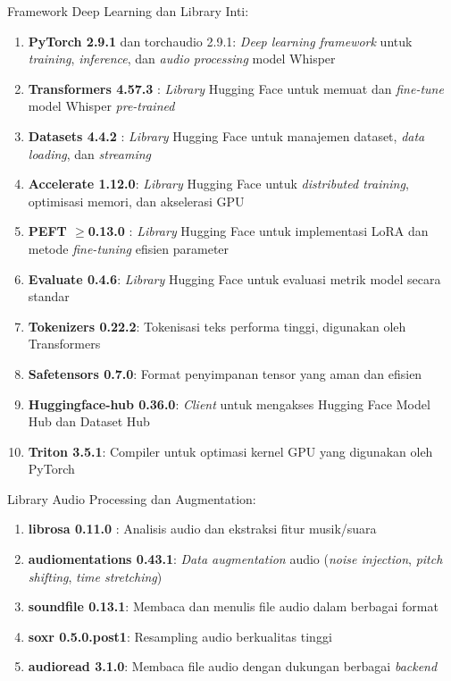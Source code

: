 \vspace{0.3cm}
\noindent
Framework Deep Learning dan Library Inti:
\begin{enumerate}[noitemsep]
    \item \textbf{PyTorch 2.9.1} \cite{paszke2019pytorch} dan torchaudio 2.9.1: \textit{Deep learning framework} untuk \textit{training}, \textit{inference}, dan \textit{audio processing} model Whisper
    \item \textbf{Transformers 4.57.3} \cite{wolf2020transformers}: \textit{Library} Hugging Face untuk memuat dan \textit{fine-tune} model Whisper \textit{pre-trained}
    \item \textbf{Datasets 4.4.2} \cite{lhoest2021datasets}: \textit{Library} Hugging Face untuk manajemen dataset, \textit{data loading}, dan \textit{streaming}
    \item \textbf{Accelerate 1.12.0}: \textit{Library} Hugging Face untuk \textit{distributed training}, optimisasi memori, dan akselerasi GPU
    \item \textbf{PEFT $\geq$0.13.0} \cite{hu2022lora,manmatha2017peft}: \textit{Library} Hugging Face untuk implementasi LoRA dan metode \textit{fine-tuning} efisien parameter
    \item \textbf{Evaluate 0.4.6}: \textit{Library} Hugging Face untuk evaluasi metrik model secara standar
    \item \textbf{Tokenizers 0.22.2}: Tokenisasi teks performa tinggi, digunakan oleh Transformers
    \item \textbf{Safetensors 0.7.0}: Format penyimpanan tensor yang aman dan efisien
    \item \textbf{Huggingface-hub 0.36.0}: \textit{Client} untuk mengakses Hugging Face Model Hub dan Dataset Hub
    \item \textbf{Triton 3.5.1}: Compiler untuk optimasi kernel GPU yang digunakan oleh PyTorch
\end{enumerate}

\vspace{0.3cm}
\noindent
Library Audio Processing dan Augmentation:
\begin{enumerate}[noitemsep]
    \item \textbf{librosa 0.11.0} \cite{mcfee2015librosa}: Analisis audio dan ekstraksi fitur musik/suara
    \item \textbf{audiomentations 0.43.1}: \textit{Data augmentation} audio (\textit{noise injection}, \textit{pitch shifting}, \textit{time stretching}) \cite{ko2015audio,park2019specaugment}
    \item \textbf{soundfile 0.13.1}: Membaca dan menulis file audio dalam berbagai format
    \item \textbf{soxr 0.5.0.post1}: Resampling audio berkualitas tinggi
    \item \textbf{audioread 3.1.0}: Membaca file audio dengan dukungan berbagai \textit{backend}
\end{enumerate}

